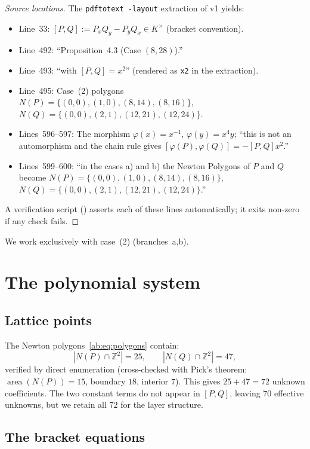 \documentclass[a4paper,11pt]{article}
\newcommand{\filename}[1]{\texttt{\seqsplit{#1}}}
\theoremstyle{plain}
\theoremstyle{definition}
\theoremstyle{remark}
\begin{document}
\begin{proof}[Source locations]
The \texttt{pdftotext -layout} extraction of v1 yields:
\begin{itemize}[nosep]
\item Line~33: $[P,Q]:=P_xQ_y-P_yQ_x\in K^\times$ (bracket convention).
\item Line~492: ``Proposition~4.3 (Case $(8,28)$).''
\item Line~493: ``with $[P,Q]=x^2$'' (rendered as \texttt{x2} in the extraction).
\item Line~495: Case~(2) polygons\\
$N(P)=\{(0,0),(1,0),(8,14),(8,16)\}$, $N(Q)=\{(0,0),(2,1),(12,21),(12,24)\}$.
\item Lines~596--597: The morphism $\varphi(x)=x^{-1}$, $\varphi(y)=x^4y$; ``this is not an automorphism and the chain rule gives $[\varphi(P),\varphi(Q)]=-[P,Q]x^2$.''
\item Lines~599--600: ``in the cases a) and b) the Newton Polygons of $P$ and $Q$ become $N(P)=\{(0,0),(1,0),(8,14),(8,16)\}$, $N(Q)=\{(0,0),(2,1),(12,21),(12,24)\}$.''
\end{itemize}
A verification script (\filename{source\_gate\_verify.py}) asserts each of these lines automatically; it exits non-zero if any check fails.
\end{proof}

We work exclusively with case~(2) (branches~a,b).

\section{The polynomial system}\label{ab:sec:system}

\subsection{Lattice points}

The Newton polygons~\eqref{ab:eq:polygons} contain:
\begin{equation}
|N(P)\cap\mathbb{Z}^2|=25,\qquad |N(Q)\cap\mathbb{Z}^2|=47,
\end{equation}
verified by direct enumeration (cross-checked with Pick's theorem: $\operatorname{area}(N(P))=15$, boundary $18$, interior $7$). This gives $25+47=72$ unknown coefficients. The two constant terms do not appear in $[P,Q]$, leaving $70$ effective unknowns, but we retain all $72$ for the layer structure.

\subsection{The bracket equations}
\end{document}
